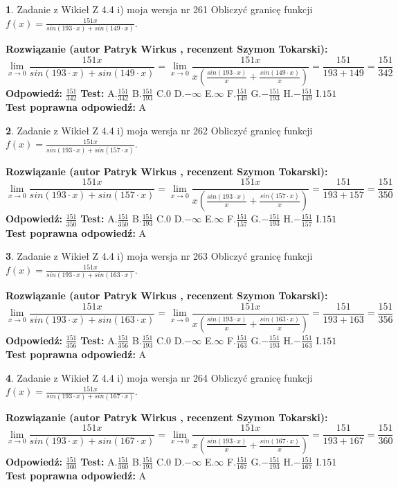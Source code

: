 \documentclass[12pt, a4paper]{article}
\theoremstyle{definition} %
\newtheorem{zad}{}
\newcommand{\zadStart}[1]{\begin{zad}#1\newline}
\newcommand{\zadStop}{\end{zad}}
\newcommand{\rozwStart}[2]{\noindent \textbf{Rozwiązanie (autor #1 , recenzent #2): }\newline}
\newcommand{\rozwStop}{\newline}
\newcommand{\odpStart}{\noindent \textbf{Odpowiedź:}\newline}
\newcommand{\odpStop}{\newline}
\newcommand{\testStart}{\noindent \textbf{Test:}\newline}
\newcommand{\testStop}{\newline}
\newcommand{\kluczStart}{\noindent \textbf{Test poprawna odpowiedź:}\newline}
\newcommand{\kluczStop}{\newline}
\begin{document}
\zadStart{Zadanie z Wikieł Z 4.4 i) moja wersja nr 261}
Obliczyć granicę funkcji $f(x)=\frac{151x}{sin(193\cdot x) +sin(149\cdot x)}$.
\zadStop
\rozwStart{Patryk Wirkus}{Szymon Tokarski}
$$\lim\limits_{x\to 0}\frac{151x}{sin(193\cdot x) +sin(149\cdot x)}=\lim\limits_{x\to 0}\frac{151x}{x(\frac{sin(193\cdot x)}{x}+\frac{sin(149\cdot x)}{x})}=\frac{151}{193+149} = \frac{151}{342}$$
\rozwStop
\odpStart
$\frac{151}{342}$
\odpStop
\testStart
A.$\frac{151}{342}$
B.$\frac{151}{193}$
C.$0$
D.$-\infty$
E.$\infty$
F.$\frac{151}{149}$
G.$-\frac{151}{193}$
H.$-\frac{151}{149}$
I.$151$
\testStop
\kluczStart
A
\kluczStop



\zadStart{Zadanie z Wikieł Z 4.4 i) moja wersja nr 262}
Obliczyć granicę funkcji $f(x)=\frac{151x}{sin(193\cdot x) +sin(157\cdot x)}$.
\zadStop
\rozwStart{Patryk Wirkus}{Szymon Tokarski}
$$\lim\limits_{x\to 0}\frac{151x}{sin(193\cdot x) +sin(157\cdot x)}=\lim\limits_{x\to 0}\frac{151x}{x(\frac{sin(193\cdot x)}{x}+\frac{sin(157\cdot x)}{x})}=\frac{151}{193+157} = \frac{151}{350}$$
\rozwStop
\odpStart
$\frac{151}{350}$
\odpStop
\testStart
A.$\frac{151}{350}$
B.$\frac{151}{193}$
C.$0$
D.$-\infty$
E.$\infty$
F.$\frac{151}{157}$
G.$-\frac{151}{193}$
H.$-\frac{151}{157}$
I.$151$
\testStop
\kluczStart
A
\kluczStop



\zadStart{Zadanie z Wikieł Z 4.4 i) moja wersja nr 263}
Obliczyć granicę funkcji $f(x)=\frac{151x}{sin(193\cdot x) +sin(163\cdot x)}$.
\zadStop
\rozwStart{Patryk Wirkus}{Szymon Tokarski}
$$\lim\limits_{x\to 0}\frac{151x}{sin(193\cdot x) +sin(163\cdot x)}=\lim\limits_{x\to 0}\frac{151x}{x(\frac{sin(193\cdot x)}{x}+\frac{sin(163\cdot x)}{x})}=\frac{151}{193+163} = \frac{151}{356}$$
\rozwStop
\odpStart
$\frac{151}{356}$
\odpStop
\testStart
A.$\frac{151}{356}$
B.$\frac{151}{193}$
C.$0$
D.$-\infty$
E.$\infty$
F.$\frac{151}{163}$
G.$-\frac{151}{193}$
H.$-\frac{151}{163}$
I.$151$
\testStop
\kluczStart
A
\kluczStop



\zadStart{Zadanie z Wikieł Z 4.4 i) moja wersja nr 264}
Obliczyć granicę funkcji $f(x)=\frac{151x}{sin(193\cdot x) +sin(167\cdot x)}$.
\zadStop
\rozwStart{Patryk Wirkus}{Szymon Tokarski}
$$\lim\limits_{x\to 0}\frac{151x}{sin(193\cdot x) +sin(167\cdot x)}=\lim\limits_{x\to 0}\frac{151x}{x(\frac{sin(193\cdot x)}{x}+\frac{sin(167\cdot x)}{x})}=\frac{151}{193+167} = \frac{151}{360}$$
\rozwStop
\odpStart
$\frac{151}{360}$
\odpStop
\testStart
A.$\frac{151}{360}$
B.$\frac{151}{193}$
C.$0$
D.$-\infty$
E.$\infty$
F.$\frac{151}{167}$
G.$-\frac{151}{193}$
H.$-\frac{151}{167}$
I.$151$
\testStop
\kluczStart
A
\kluczStop
\end{document}
